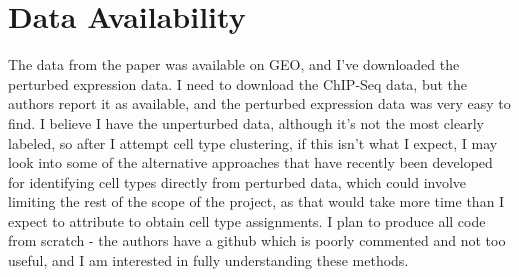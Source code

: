 \documentclass[letterpaper, 11pt]{article}
\begin{document}
\section*{Data Availability}
The data from the paper was available on GEO, and I've downloaded the perturbed expression data. I need to download the ChIP-Seq data, but the authors report it as available, and the perturbed expression data was very easy to find. I believe I have the unperturbed data, although it's not the most clearly labeled, so after I attempt cell type clustering, if this isn't what I expect, I may look into some of the alternative approaches that have recently been developed for identifying cell types directly from perturbed data, which could involve limiting the rest of the scope of the project, as that would take more time than I expect to attribute to obtain cell type assignments. I plan to produce all code from scratch - the authors have a github which is poorly commented and not too useful, and I am interested in fully understanding these methods.


\end{document}

